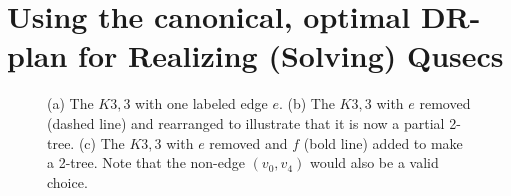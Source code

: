 \section{Using the canonical, optimal DR-plan for Realizing (Solving) Qusecs}
\label{sec:recomb}

\begin{figure*}\centering
\begin{subfigure}{.2\linewidth}\centering
    
    \caption{}
\end{subfigure}
\begin{subfigure}{.15\linewidth}\centering
    
    \caption{}
\end{subfigure}
\begin{subfigure}{.15\linewidth}\centering
    
    \caption{}
\end{subfigure}

\caption{(a) The $K3,3$ with one labeled edge $e$. (b) The $K3,3$ with $e$ removed (dashed line) and rearranged to illustrate that it is now a partial 2-tree. (c) The $K3,3$ with $e$ removed and $f$ (bold line) added to make a 2-tree. Note that the non-edge $(v_0,v_4)$ would also be a valid choice.}
\label{fig:omd_k33_example}
\end{figure*}





%         
%         
%         

